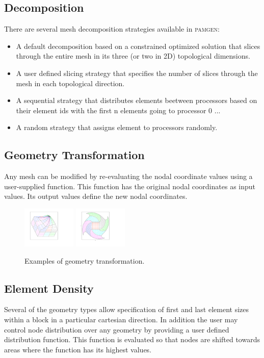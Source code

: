 \subsection{Decomposition}
There are several mesh decomposition strategies available in \textsc{pamgen}:
\begin{itemize}\addtolength{\itemsep}{-0.5\baselineskip}
\item A default decomposition based on a constrained optimized solution that slices through the entire mesh in its three (or two in 2D) topological dimensions.
\item A user defined slicing strategy that specifies the number of slices through the mesh in each topological direction.
\item A sequential strategy that distributes elements beetween processors based on their element ids with the first n  elements going to processor 0 ...
\item A random strategy that assigns element to processors randomly.
\end{itemize}

\subsection {Geometry Transformation}
Any mesh can be modified by re-evaluating the nodal coordinate values using a user-supplied function. This function has the original nodal coordinates as input values. Its output values define the new nodal coordinates.



\begin{figure}[h]
    \centering
      \includegraphics[width=1.0in]{figures/3d_warped_geometry_white_bg}
      \includegraphics[width=1.0in]{figures/mesh_warp_2d_white_bg}
  \caption{Examples of geometry transformation.}
  \label{fig:btm}
\end{figure}


\subsection{Element Density}
Several of the geometry types allow specification of first and last element sizes within a block in a particular cartesian direction. In addition the user may control node distribution over any geometry by providing a user defined distribution function. This function is evaluated so that nodes are shifted towards areas where the function has its highest values.

